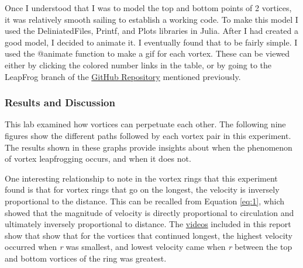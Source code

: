 \documentclass{article}
\begin{document}
Once I understood that I was to model the top and bottom points of 2 vortices, it was relatively smooth sailing to establish a working code. To make this model I used the DeliniatedFiles, Printf, and Plots libraries in Julia. After I had created a good model, I decided to animate it. I eventually found that to be fairly simple. I used the \textcolor{Dandelion}{@animate} function to make a gif for each vortex. These can be viewed either by clicking the colored number links in the table, or by going to the LeapFrog branch of the \href{https://github.com/JoeSpencer1/497R-Projects.git}{GitHub Repository} mentioned previously. \newline

\subsubsection*{Results and Discussion}

This lab examined how vortices can perpetuate each other. The following nine figures show the different paths followed by each vortex pair in this experiment. The results shown in these graphs provide insights about when the phenomenon of vortex leapfrogging occurs, and when it does not.\newline

One interesting relationship to note in the vortex rings that this experiment found is that for vortex rings that go on the longest, the velocity is inversely proportional to the distance. This can be recalled from Equation \ref{eq:1}, which showed that the magnitude of velocity is directly proportional to circulation and ultimately inversely proportional to distance. The 
\href{https://imgur.com/U4cND6X,}{videos} included in this report show that show that for the vortices that continued longest, the highest velocity occurred when \emph{r} was smallest, and lowest velocity came when \emph{r} between the top and bottom vortices of the ring was greatest. \newline

\clearpage

\printglossaries
\end{document}
